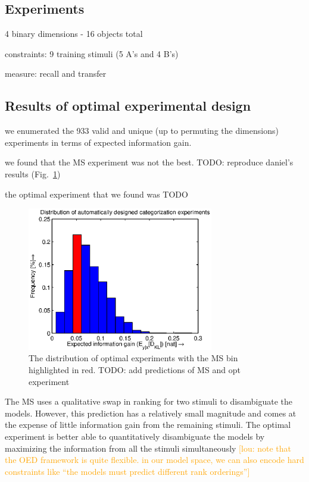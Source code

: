 \documentclass{article}
\newcommand{\lou}[1]{\textcolor{orange}{[lou: #1]}}
\newcommand{\cas}[1]{ \textsf{\color{darkgray} \scriptsize #1} }
\begin{document}



\subsection{Experiments}

\cas{4 binary dimensions - 16 objects total}

\cas{constraints: 9 training stimuli (5 A's and 4 B's)}

\cas{measure: recall and transfer}

\subsection{Results of optimal experimental design}

\cas{we enumerated the 933 valid and unique (up to permuting the dimensions) experiments in terms of expected information gain.}

\cas{we found that the MS experiment was not the best. TODO: reproduce daniel's results (Fig.~\ref{fig:dist})}

\cas{the optimal experiment that we found was TODO}

\begin{figure}[h!]
\centering
\includegraphics[width=3.2in]{img/dist.eps}
\caption{The distribution of optimal experiments with the MS bin highlighted in red. TODO: add predictions of MS and opt experiment}
\label{fig:dist}
\end{figure}

The MS uses a qualitative swap in ranking for two stimuli to disambiguate the models.
However, this prediction has a relatively small magnitude and comes at the expense of little information gain from the remaining stimuli.
The optimal experiment is better able to quantitatively disambiguate the models by maximizing the information from all the stimuli simultaneously
\lou{note that the OED framework is quite flexible. in our model space, we can also encode hard constraints like ``the models must predict different rank orderings''}
\end{document}
